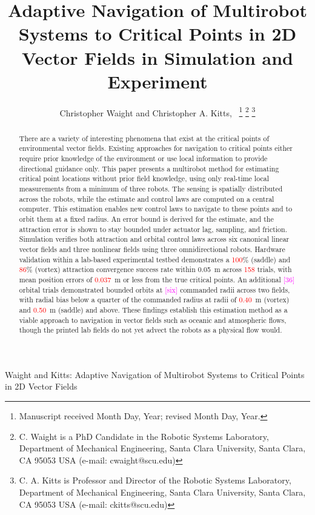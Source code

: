 \documentclass[lettersize,journal]{IEEEtran}
\newcommand{\syn}[1]{\textcolor{red}{#1}}
\newcommand{\open}[1]{\textcolor{magenta}{[#1]}}
\begin{document}
\title{Adaptive Navigation of Multirobot Systems to Critical Points in 2D Vector Fields in Simulation and Experiment}
\author{Christopher Waight and Christopher A. Kitts,~
\thanks{Manuscript received Month Day, Year; revised Month Day, Year.}
\thanks{C. Waight is a PhD Candidate in the Robotic Systems Laboratory, Department of Mechanical Engineering, Santa Clara University, Santa Clara, CA 95053 USA (e-mail: cwaight@scu.edu)}
\thanks{C. A. Kitts is Professor and Director of the Robotic Systems Laboratory, Department of Mechanical Engineering, Santa Clara University, Santa Clara, CA 95053 USA (e-mail: ckitts@scu.edu)}
}
%
{Waight and Kitts: Adaptive Navigation of Multirobot Systems to Critical Points in 2D Vector Fields}


\maketitle

\begin{abstract}
    There are a variety of interesting phenomena that exist at the critical points of environmental vector fields. Existing approaches for navigation to critical points either require prior knowledge of the environment or use local information to provide directional guidance only. This paper presents a multirobot method for estimating critical point locations without prior field knowledge, using only real-time local measurements from a minimum of three robots. The sensing is spatially distributed across the robots, while the estimate and control laws are computed on a central computer.
    This estimation enables new control laws to navigate to these points and to orbit them at a fixed radius.
    An error bound is derived for the estimate, and the attraction error is shown to stay bounded under actuator lag, sampling, and friction.
    Simulation verifies both attraction and orbital control laws across six canonical linear vector fields and three nonlinear fields using three omnidirectional robots. Hardware validation within a lab-based experimental testbed demonstrates a \syn{100}\% (saddle) and \syn{86}\% (vortex) attraction convergence success rate within 0.05~m across \syn{158} trials, with mean position errors of \syn{0.037}~m or less from the true critical points. An additional \open{36} orbital trials demonstrated bounded orbits at \open{six} commanded radii across two fields, with radial bias below a quarter of the commanded radius at radii of \syn{0.40}~m (vortex) and \syn{0.50}~m (saddle) and above.
    These findings establish this estimation method as a viable approach to navigation in vector fields such as oceanic and atmospheric flows, though the printed lab fields do not yet advect the robots as a physical flow would.

\end{abstract}
\end{document}
